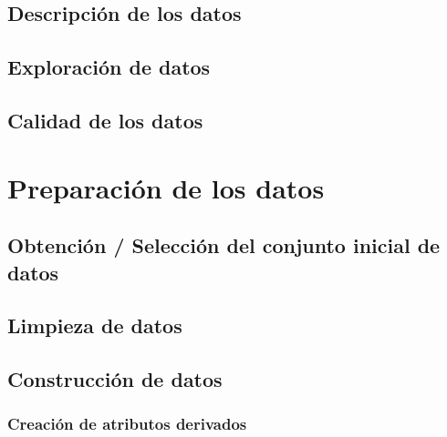 \documentclass[11pt,a4paper]{tesis}
\begin{document}
\section{Descripción de los datos}

\section{Exploración de datos}\label{exploracion_datos}

\section{Calidad de los datos}\label{calidad_datos}


\chapter{Preparación de los datos}

\section{Obtención / Selección del conjunto inicial de datos}

\section{Limpieza de datos}\label{limpiar_datos}

\section{Construcción de datos}
\subsection{Creación de atributos derivados}\label{atributos_derivados}

\end{document}
